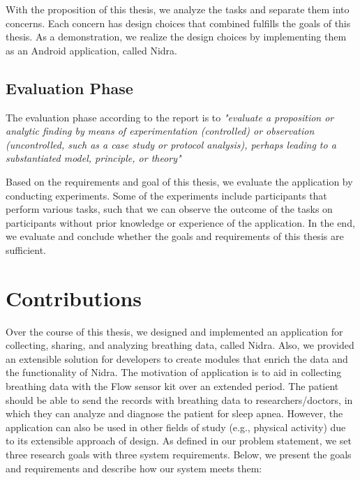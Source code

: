 With the proposition of this thesis, we analyze the tasks and separate them into concerns. Each concern has design choices that combined fulfills the goals of this thesis. As a demonstration, we realize the design choices by implementing them as an Android application, called Nidra. 

\subsection{Evaluation Phase}
The evaluation phase according to the report is to \textit{"evaluate a proposition or analytic finding by means of experimentation (controlled) or observation (uncontrolled, such as a case study or protocol analysis), perhaps leading to a substantiated model, principle, or theory"}

Based on the requirements and goal of this thesis, we evaluate the application by conducting experiments. Some of the experiments include participants that perform various tasks, such that we can observe the outcome of the tasks on participants without prior knowledge or experience of the application. In the end, we evaluate and conclude whether the goals and requirements of this thesis are sufficient.

\section{Contributions}
Over the course of this thesis, we designed and implemented an application for collecting, sharing, and analyzing breathing data, called Nidra. Also, we provided an extensible solution for developers to create modules that enrich the data and the functionality of Nidra. The motivation of application is to aid in collecting breathing data with the Flow sensor kit over an extended period. The patient should be able to send the records with breathing data to researchers/doctors, in which they can analyze and diagnose the patient for sleep apnea. However, the application can also be used in other fields of study (e.g., physical activity)  due to its extensible approach of design. As defined in our problem statement, we set three research goals with three system requirements. Below, we present the goals and requirements and describe how our system meets them:

